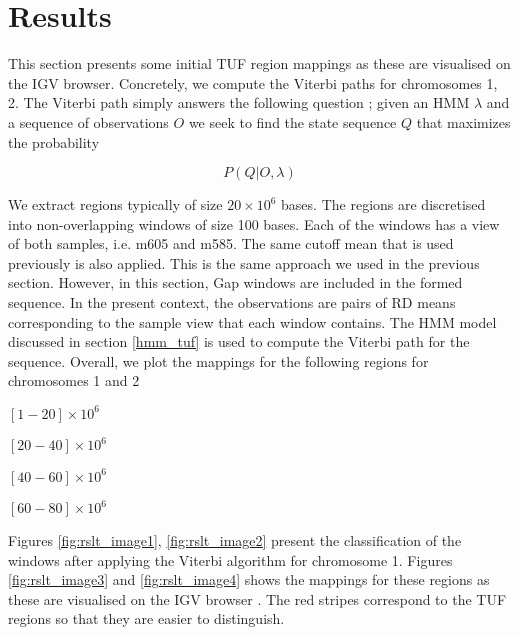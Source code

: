 \documentclass[12pt]{article}
\let\tempone\itemize
\let\temptwo\enditemize
\renewenvironment{itemize}{\tempone\setlength{\itemsep}{0pt}}{\temptwo}
\begin{document}
 
\section{Results}
\label{results}

This section presents some initial TUF region mappings as these are visualised on the IGV browser.
Concretely, we compute  the Viterbi paths for chromosomes 1, 2. 
The Viterbi path simply answers the following 
question \cite{rabiner2009}; given an HMM $\lambda$ and a sequence of observations $O$ we seek to find the state sequence  $Q$ that maximizes the probability 

\begin{equation}
P(Q|O, \lambda)
\end{equation}

We extract regions typically of size $20\times 10^6$ bases. The regions are 
discretised into non-overlapping  windows of size 100 bases. Each of the windows has a view of both samples, i.e. m605 and m585.  The same cutoff mean that is used previously is also applied.
This is the same approach we used in the previous section. However, in this section, Gap windows are included in the formed sequence. In the present context, the observations are pairs of RD means corresponding to the sample view that each window contains. The HMM model discussed in section \ref{hmm_tuf} is used to compute the Viterbi path for the sequence. Overall, we plot the mappings for the following regions for chromosomes 1 and 2 

\begin{itemize}
	\item $[1-20]\times 10^6$
	\item $[20-40]\times 10^6$
	\item $[40-60]\times 10^6$
	\item $[60-80]\times 10^6$
\end{itemize} 

Figures \ref{fig:rslt_image1}, \ref{fig:rslt_image2} present the classification of the windows after applying the Viterbi algorithm for chromosome 1. 
Figures \ref{fig:rslt_image3} and \ref{fig:rslt_image4} shows the mappings for these regions as these are visualised on the IGV browser \cite{2011Robinson}. The red stripes correspond to the TUF regions so that they are easier to distinguish. 

\end{document}
